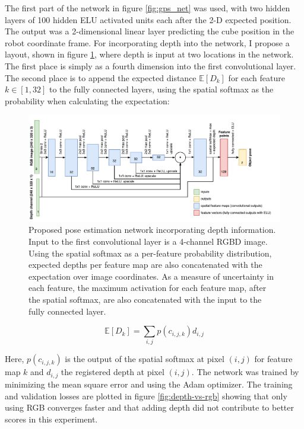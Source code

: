 The first part of the network in figure \ref{fig:gps_net} was used, with two
hidden layers of 100 hidden ELU activated units each after the 2-D expected
position. The output was a 2-dimensional linear layer predicting the cube
position in the robot coordinate frame. For incorporating depth into the
network, I propose a layout, shown in figure \ref{fig:depth_net}, where depth
is input at two locations in the network. The first place is simply as a fourth
dimension into the first convolutional layer. The second place is to append the
expected distance $\mathbb{E}[D_k]$ for each feature $k \in [1, 32]$ to the
fully connected layers, using the spatial softmax as the probability when
calculating the expectation:

\begin{figure}[h!]
    \centering
    \includegraphics[width=1.0 \textwidth]{res/depth_net.pdf}

    \caption{Proposed pose estimation network incorporating depth information.
    Input to the first convolutional layer is a 4-channel RGBD image. Using the
    spatial softmax as a per-feature probability distribution, expected depths
    per feature map are also concatenated with the expectation over image
    coordinates. As a measure of uncertainty in each feature, the maximum
    activation for each feature map, after the spatial softmax, are also
    concatenated with the input to the fully connected layer.}

    \label{fig:depth_net}
    
\end{figure}

\begin{equation}
    \mathbb{E}[D_{k}] = \sum_{i, j} p(c_{i, j, k}) d_{i, j}
\end{equation}

Here, $p(c_{i, j, k})$ is the output of the spatial softmax at pixel $(i, j)$
for feature map $k$ and $d_{i, j}$ the registered depth at pixel $(i, j)$. The
network was trained by minimizing the mean square error and using the Adam
optimizer. The training and validation losses are plotted in figure
\ref{fig:depth-vs-rgb} showing that only using RGB converges faster and that
adding depth did not contribute to better scores in this experiment.

